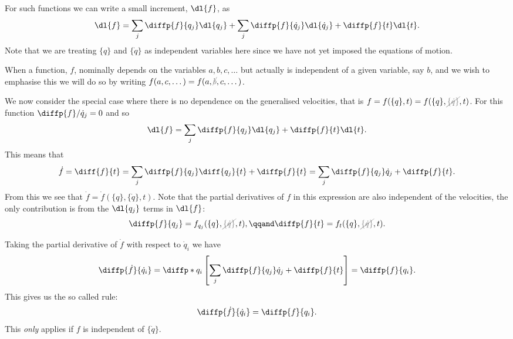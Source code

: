 \documentclass[fleqn]{NotesClass}
\newcommand*{\nodependence}[1]{\textcolor{gray}{\cancel{#1}}}
\begin{document}
    For such functions we can write a small increment, \(\dl{f}\), as
    \begin{equation}
        \dl{f} = \sum_j \diffp{f}{q_j} \dl{q_j} + \sum_j \diffp{f}{\dot{q}_j} \dl{\dot{q}_j} + \diffp{f}{t}\dl{t}.
    \end{equation}
    Note that we are treating \(\{q\}\) and \(\{\dot{q}\}\) as independent variables here since we have not yet imposed the equations of motion.
    
    \begin{ntn}{}{}
        When a function, \(f\), nominally depends on the variables \(a, b, c, \dotsc\) but actually is independent of a given variable, say \(b\), and we wish to emphasise this we will do so by writing \(f(a, c, \dotsc) = f(a, \nodependence{b}, c, \dotsc)\).
    \end{ntn}
    
    We now consider the special case where there is no dependence on the generalised velocities, that is \(f = f(\{q\}, t) = f(\{q\}, \nodependence{\{\dot{q}\}}, t)\).
    For this function \(\diffp{f}/{\dot{q}_j} = 0\) and so
    \begin{equation}
        \dl{f} = \sum_j \diffp{f}{q_j} \dl{q_j} + \diffp{f}{t}\dl{t}.
    \end{equation}
    This means that
    \begin{equation}
        \dot{f} = \diff{f}{t} = \sum_j \diffp{f}{q_j}\diff{q_j}{t} + \diffp{f}{t} = \sum_j \diffp{f}{q_j}\dot{q}_j + \diffp{f}{t}.
    \end{equation}
    From this we see that \(\dot{f} = \dot{f}(\{q\}, \{\dot{q}\}, t)\).
    Note that the partial derivatives of \(f\) in this expression are also independent of the velocities, the only contribution is from the \(\dl{q_j}\) terms in \(\dl{f}\):
    \begin{equation}
        \diffp{f}{q_j} = f_{q_j}(\{q\}, \nodependence{\{\dot{q}\}}, t), \qqand \diffp{f}{t} = f_t(\{q\}, \nodependence{\{\dot{q}\}}, t).
    \end{equation}
    
    Taking the partial derivative of \(\dot{f}\) with respect to \(\dot{q}_i\) we have
    \begin{equation}
        \diffp{\dot{f}}{\dot{q}_i} = \diffp*{}{q_i} \left[ \sum_j \diffp{f}{q_j}\dot{q}_j + \diffp{f}{t} \right] = \diffp{f}{q_i}.
    \end{equation}
    This gives us the so called  rule:
    \begin{equation}\label{eqn:cancellation of dots}
        \diffp{\dot{f}}{\dot{q}_i} = \diffp{f}{q_i}.
    \end{equation}
    This \emph{only} applies if \(f\) is independent of \(\{\dot{q}\}\).
    
\end{document}
